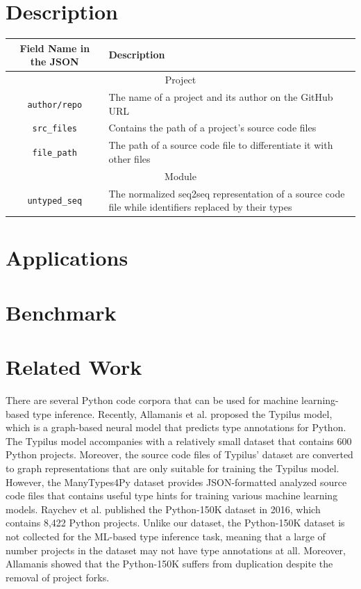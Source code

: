\documentclass[10pt, conference]{IEEEtran}
\begin{document}
\section{Description}

\begin{table}[t]
	\centering
	\begin{tabular}{c l}
		\toprule
		Field Name in the JSON & Description \\
		\midrule
		\multicolumn{2}{c}{Project}  \\
		\midrule
		\texttt{author/repo} & The name of a project and its author on the GitHub URL  \\
		\midrule
		\texttt{src\_files} & Contains the path of a project's source code files \\
		\midrule
		\texttt{file\_path} & The path of a source code file to differentiate it with other files \\
		\midrule
		\multicolumn{2}{c}{Module}  \\
		\midrule
		\texttt{untyped\_seq} & The normalized seq2seq representation of a source code file while identifiers replaced by their types \\
		\midrule
		
		\bottomrule
	\end{tabular}
\end{table}

\section{Applications}


\section{Benchmark}

\section{Related Work}
There are several Python code corpora that can be used for machine learning-based type inference. Recently, Allamanis et al. \cite{allamanis2020typilus} proposed the Typilus model, which is a graph-based neural model that predicts type annotations for Python. The Typilus model \cite{allamanis2020typilus} accompanies with a relatively small dataset that contains 600 Python projects. Moreover, the source code files of Typilus' dataset are converted to graph representations that are only suitable for training the Typilus model. However, the ManyTypes4Py dataset provides JSON-formatted analyzed source code files that contains useful type hints for training various machine learning models. Raychev et al. \cite{raychev2016probabilistic} published the Python-150K dataset in 2016, which contains 8,422 Python projects. Unlike our dataset, the Python-150K dataset \cite{raychev2016probabilistic} is not collected for the ML-based type inference task, meaning that a large of number projects in the dataset may not have type annotations at all. Moreover, Allamanis \cite{allamanis2019adverse} showed that the Python-150K suffers from duplication despite the removal of project forks.
\end{document}
